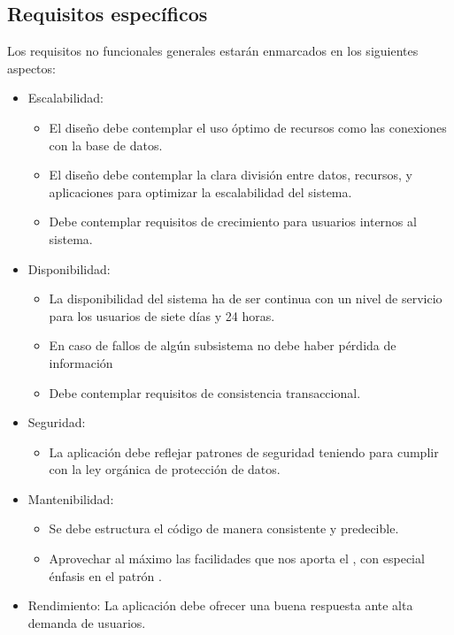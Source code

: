 \subsection{Requisitos específicos}
Los requisitos no funcionales generales estarán enmarcados en los
siguientes aspectos:
\begin{itemize}
  \item Escalabilidad:
    \begin{itemize}
      \item El diseño debe contemplar el uso óptimo de recursos como
        las conexiones con la base de datos.
      \item El diseño debe contemplar la clara división entre datos,
        recursos, y aplicaciones para optimizar la escalabilidad del
        sistema.
      \item Debe contemplar requisitos de crecimiento para usuarios
        internos al sistema.
    \end{itemize}
  \item Disponibilidad:
     \begin{itemize}
       \item La disponibilidad del sistema ha de ser continua con un
         nivel de servicio para los usuarios de siete días y 24
         horas.
       \item En caso de fallos de algún subsistema no debe haber
         pérdida de información
       \item Debe contemplar requisitos de consistencia transaccional.
     \end{itemize}
  \item Seguridad:
    \begin{itemize}
      \item La aplicación debe reflejar patrones de seguridad teniendo
        para cumplir con la ley orgánica de protección de datos.
    \end{itemize}
  \item Mantenibilidad:
    \begin{itemize}
      \item Se debe estructura el código de manera consistente y
        predecible.
      \item Aprovechar al máximo las facilidades que nos aporta el
        , con especial énfasis en el
        patrón .
    \end{itemize}
  \item Rendimiento: La aplicación debe ofrecer una buena respuesta
    ante alta demanda de usuarios.
\end{itemize}
